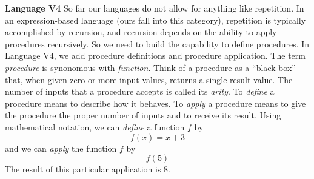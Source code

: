 \begin{minipage}[t]{\sw}
\slidenumber
\LARGE
{\bf Language V4}\exx
So far our languages do not allow for anything like repetition.
In an expression-based language (ours fall into this category),
repetition is typically accomplished by recursion,
and recursion depends on the ability to apply procedures recursively.
So we need to build the capability to define procedures.\exx
In Language V4, we add procedure definitions
and procedure application.
The term {\em procedure} is synonomous with {\em function}.\exx
Think of a procedure as a ``black box''
that, when given zero or more input values,
returns a single result value.
The number of inputs that a procedure accepts is called its {\em arity}.\exx
To {\em define} a procedure means
to describe how it behaves.
To {\em apply} a procedure means
to give the procedure the proper number of inputs
and to receive its result.\exx
Using mathematical notation, we can {\em define} a function $f$ by
{\Large\[f(x) = x+3\]}
and we can {\em apply} the function $f$ by
{\Large\[f(5)\]}
The result of this particular application is $8$.
\end{minipage}

\clearpage
